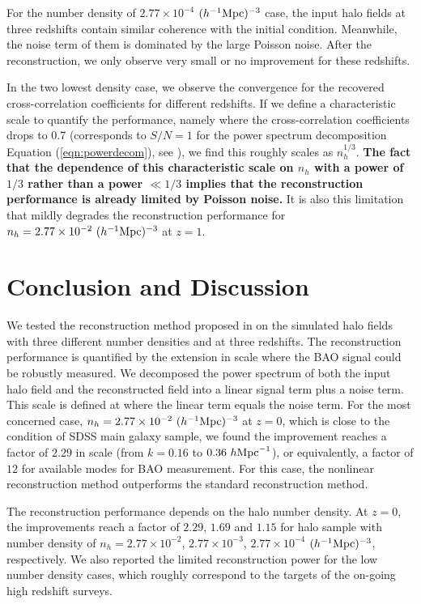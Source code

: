 \documentclass[iop]{emulateapj}
\newcommand{\mpch}{h^{-1} {\rm Mpc}}
\newcommand{\hmpc}{h {\rm Mpc}^{-1}}
\begin{document}
{For the number density of $2.77\times 10^{-4}$ $(\mpch)^{-3}$ case, the input halo fields at three redshifts contain similar coherence with the initial condition.
Meanwhile, the noise term of them is dominated by the large Poisson noise.
After the reconstruction, we only observe very small or no improvement for these redshifts.

In the two lowest density case, we observe the convergence for the recovered cross-correlation coefficients for different redshifts.
If we define a characteristic scale to quantify the performance, namely where the cross-correlation coefficients drops to 0.7 (corresponds to $S/N=1$ for the power spectrum decomposition Equation (\ref{eqn:powerdecom}), see \cite{zhuhm16a}),   
we find this roughly scales as $n_h^{1/3}$.
{\bf The fact that the dependence of this characteristic scale on $n_h$ with a power of $1/3$ rather than a power $\ll 1/3$ implies that the reconstruction performance is already limited by Poisson noise.}
It is also this limitation that mildly degrades the reconstruction performance for $n_h=2.77\times 10^{-2}\ (\mpch)^{-3}$ at $z=1$.



\section{Conclusion and Discussion}
\label{sec:conclusion}

We tested the reconstruction method proposed in \citet{zhuhm16c} on the simulated halo fields with three different number densities and at three redshifts.
The reconstruction performance is quantified by the extension in scale where the BAO signal could be robustly measured.
We decomposed the power spectrum of both the input halo field and the reconstructed field into a linear signal term plus a noise term.
This scale is defined at where the linear term equals the noise term.
For the most concerned case, $n_h=2.77\times 10^{-2}\ (\mpch)^{-3}$ at $z=0$, which is close to the condition of SDSS main galaxy sample, we found the improvement reaches a factor of $2.29$ in scale (from $k=0.16$ to $0.36\ \hmpc$), or equivalently, a factor of $12$ for available modes for BAO measurement.
For this case, the nonlinear reconstruction method outperforms the standard reconstruction method.

The reconstruction performance depends on the halo number density.
At $z=0$, the improvements reach a factor of $2.29$, $1.69$ and $1.15$ for halo sample with number density of $n_h=2.77\times 10^{-2}$, $2.77\times 10^{-3}$, $2.77\times 10^{-4}$ $(\mpch)^{-3}$, respectively.
We also reported the limited reconstruction power for the low number density cases, which roughly correspond to the targets of the on-going high redshift surveys.

}
\end{document}

